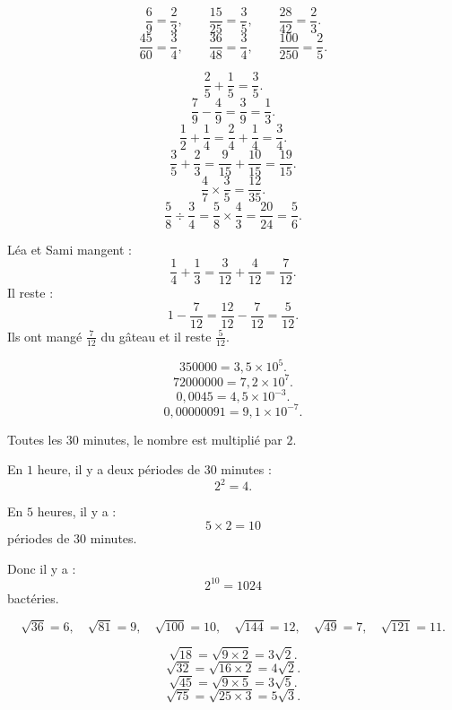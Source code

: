 \documentclass[11pt,a4paper]{article}
\newcounter{correction}
\begin{document}
\begin{correction}
\[
\frac{6}{9}=\frac{2}{3},
\qquad
\frac{15}{25}=\frac{3}{5},
\qquad
\frac{28}{42}=\frac{2}{3}.
\]
\[
\frac{45}{60}=\frac{3}{4},
\qquad
\frac{36}{48}=\frac{3}{4},
\qquad
\frac{100}{250}=\frac{2}{5}.
\]
\end{correction}

\begin{correction}
\[
\frac{2}{5}+\frac{1}{5}=\frac{3}{5}.
\]
\[
\frac{7}{9}-\frac{4}{9}=\frac{3}{9}=\frac{1}{3}.
\]
\[
\frac{1}{2}+\frac{1}{4}=\frac{2}{4}+\frac{1}{4}=\frac{3}{4}.
\]
\[
\frac{3}{5}+\frac{2}{3}=\frac{9}{15}+\frac{10}{15}=\frac{19}{15}.
\]
\[
\frac{4}{7}\times\frac{3}{5}=\frac{12}{35}.
\]
\[
\frac{5}{8}\div\frac{3}{4}
=
\frac{5}{8}\times\frac{4}{3}
=
\frac{20}{24}
=
\frac{5}{6}.
\]
\end{correction}

\begin{correction}[Gâteau]
Léa et Sami mangent :
\[
\frac{1}{4}+\frac{1}{3}
=
\frac{3}{12}+\frac{4}{12}
=
\frac{7}{12}.
\]
Il reste :
\[
1-\frac{7}{12}
=
\frac{12}{12}-\frac{7}{12}
=
\frac{5}{12}.
\]
Ils ont mangé $\frac{7}{12}$ du gâteau et il reste $\frac{5}{12}$.
\end{correction}

\begin{correction}
\[
350000=3{,}5\times10^5.
\]
\[
72000000=7{,}2\times10^7.
\]
\[
0{,}0045=4{,}5\times10^{-3}.
\]
\[
0{,}00000091=9{,}1\times10^{-7}.
\]
\end{correction}

\begin{correction}[Bactéries]
Toutes les $30$ minutes, le nombre est multiplié par $2$.

En $1$ heure, il y a deux périodes de $30$ minutes :
\[
2^2=4.
\]

En $5$ heures, il y a :
\[
5\times2=10
\]
périodes de $30$ minutes.

Donc il y a :
\[
2^{10}=1024
\]
bactéries.
\end{correction}

\begin{correction}
\[
\sqrt{36}=6,
\quad
\sqrt{81}=9,
\quad
\sqrt{100}=10,
\quad
\sqrt{144}=12,
\quad
\sqrt{49}=7,
\quad
\sqrt{121}=11.
\]
\end{correction}

\begin{correction}
\[
\sqrt{18}=\sqrt{9\times2}=3\sqrt2.
\]
\[
\sqrt{32}=\sqrt{16\times2}=4\sqrt2.
\]
\[
\sqrt{45}=\sqrt{9\times5}=3\sqrt5.
\]
\[
\sqrt{75}=\sqrt{25\times3}=5\sqrt3.
\]
\end{correction}
\end{document}
